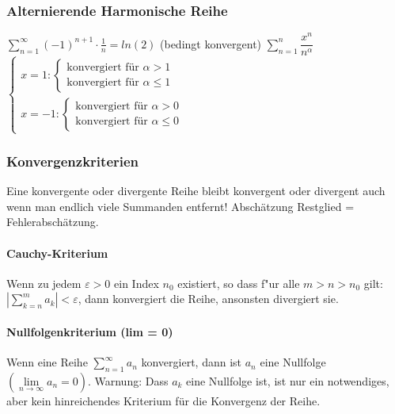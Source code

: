 \subsubsection{Alternierende Harmonische Reihe}
\textbf{$\sum\limits_{n=1}^{\infty}(-1)^{n+1}\cdot \frac{1}{n}=ln(2)$} (bedingt konvergent)
\newline
\newline
\newline
\textbf{$\sum\limits_{n=1}^{n} \dfrac{x^n}{n^\alpha}$}
\textbf{$ \left\lbrace\begin{array}{l}
	x=1: \left\lbrace\begin{array}{l}
		\text{konvergiert für } \alpha > 1\\
		\text{konvergiert für } \alpha \leq 1 
		\end{array}\right.\\
	x=-1: \left\lbrace\begin{array}{l}
		\text{konvergiert für } \alpha > 0\\
		\text{konvergiert für } \alpha \leq 0 
		\end{array}\right.
	\end{array}\right.$}


\subsubsection{Konvergenzkriterien}
Eine konvergente oder divergente Reihe bleibt konvergent oder divergent auch wenn man endlich viele Summanden entfernt!
Abschätzung Restglied = Fehlerabschätzung. \\

\paragraph{Cauchy-Kriterium} 
  Wenn zu jedem $\varepsilon > 0$ ein Index $n_0$ existiert, so dass f"ur alle
  $m > n > n_0$ gilt: \\ $\left| \sum\limits_{k=n}^m a_k \right| < \varepsilon$, dann konvergiert die Reihe, ansonsten divergiert sie.

\paragraph{Nullfolgenkriterium (lim = 0)}
  Wenn eine Reihe $ \sum\limits_{n=1}^{\infty} a_n $ konvergiert, dann ist $a_n$ eine Nullfolge $(\lim\limits_{n \to \infty} a_n = 0)$.
  \newline
  Warnung: Dass $a_k$ eine Nullfolge ist, ist nur ein notwendiges, aber kein hinreichendes Kriterium für die Konvergenz der Reihe.

